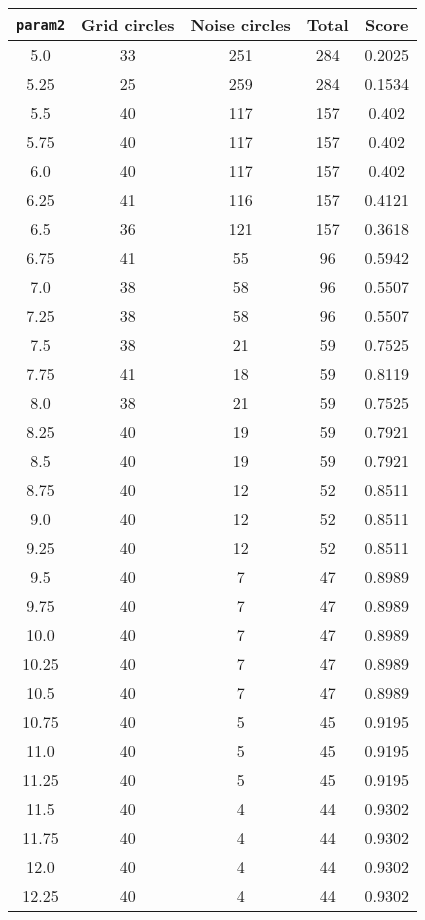 \documentclass[letterpaper, 12pt]{article}
\begin{document}
\begin{longtable}{|c|c|c|c|c|}
\hline
\textbf{\texttt{param2}} & \textbf{Grid circles} & \textbf{Noise circles} & \textbf{Total} & \textbf{Score} \\
\hline
5.0 & 33 & 251 & 284 & 0.2025 \\
\hline
5.25 & 25 & 259 & 284 & 0.1534 \\
\hline
5.5 & 40 & 117 & 157 & 0.402 \\
\hline
5.75 & 40 & 117 & 157 & 0.402 \\
\hline
6.0 & 40 & 117 & 157 & 0.402 \\
\hline
6.25 & 41 & 116 & 157 & 0.4121 \\
\hline
6.5 & 36 & 121 & 157 & 0.3618 \\
\hline
6.75 & 41 & 55 & 96 & 0.5942 \\
\hline
7.0 & 38 & 58 & 96 & 0.5507 \\
\hline
7.25 & 38 & 58 & 96 & 0.5507 \\
\hline
7.5 & 38 & 21 & 59 & 0.7525 \\
\hline
7.75 & 41 & 18 & 59 & 0.8119 \\
\hline
8.0 & 38 & 21 & 59 & 0.7525 \\
\hline
8.25 & 40 & 19 & 59 & 0.7921 \\
\hline
8.5 & 40 & 19 & 59 & 0.7921 \\
\hline
8.75 & 40 & 12 & 52 & 0.8511 \\
\hline
9.0 & 40 & 12 & 52 & 0.8511 \\
\hline
9.25 & 40 & 12 & 52 & 0.8511 \\
\hline
9.5 & 40 & 7 & 47 & 0.8989 \\
\hline
9.75 & 40 & 7 & 47 & 0.8989 \\
\hline
10.0 & 40 & 7 & 47 & 0.8989 \\
\hline
10.25 & 40 & 7 & 47 & 0.8989 \\
\hline
10.5 & 40 & 7 & 47 & 0.8989 \\
\hline
10.75 & 40 & 5 & 45 & 0.9195 \\
\hline
11.0 & 40 & 5 & 45 & 0.9195 \\
\hline
11.25 & 40 & 5 & 45 & 0.9195 \\
\hline
11.5 & 40 & 4 & 44 & 0.9302 \\
\hline
11.75 & 40 & 4 & 44 & 0.9302 \\
\hline
12.0 & 40 & 4 & 44 & 0.9302 \\
\hline
12.25 & 40 & 4 & 44 & 0.9302 \\
\hline

\end{longtable}
\end{document}

